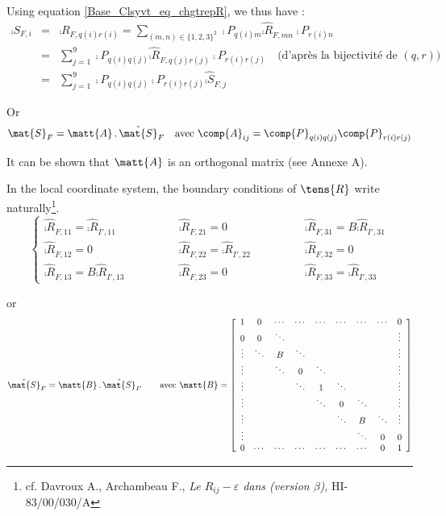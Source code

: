 Using equation \ref{Base_Clsyvt_eq_chgtrepR}, we thus have :
\begin{eqnarray}
\comp{S}_{F,i} & = & \comp{R}_{F,q(i)r(i)} =
\sum_{(m,n)\in\{1,2,3\}^2}\comp{P}_{q(i)m}\hat{\comp{R}}_{F,mn}\comp{P}_{r(i)n}\nonumber\\
&=&\sum_{j=1}^9\comp{P}_{q(i)q(j)}\hat{\comp{R}}_{F,q(j)r(j)}\comp{P}_{r(i)r(j)}
\quad\text{(d'apr\`es la bijectivit\'e de $(q,r)$)}\nonumber\\
&=&\sum_{j=1}^9\comp{P}_{q(i)q(j)}\comp{P}_{r(i)r(j)}\hat{\comp{S}}_{F,j}
\end{eqnarray}

Or
\begin{equation}
\mat{S}_{F}=\matt{A}\,.\,\hat{\mat{S}}_F\quad\text{avec }
\comp{A}_{ij}=\comp{P}_{q(i)q(j)}\comp{P}_{r(i)r(j)}
\end{equation}

It can be shown that $\matt{A}$ is an orthogonal matrix (see Annexe A).


In the local coordinate system, the boundary conditions of $\tens{R}$
write naturally\footnote{cf. Davroux A., Archambeau F., {\em Le
$R_{ij}-\varepsilon$ dans \CS (version $\beta$)}, HI-83/00/030/A}.
\begin{equation}
\label{Base_Clsyvt_eq_clRij}%
\left\{\begin{array}{lll}
\hat{\comp{R}}_{F,11}=\hat{\comp{R}}_{I',11} \qquad\qquad&
\hat{\comp{R}}_{F,21}=0 \qquad\qquad&
\hat{\comp{R}}_{F,31}=B\hat{\comp{R}}_{I',31} \\
\hat{\comp{R}}_{F,12}=0 \qquad\qquad&
\hat{\comp{R}}_{F,22}=\hat{\comp{R}}_{I',22} \qquad\qquad&
\hat{\comp{R}}_{F,32}=0 \\
\hat{\comp{R}}_{F,13}=B\hat{\comp{R}}_{I',13} \qquad\qquad&
\hat{\comp{R}}_{F,23}=0 \qquad\qquad&
\hat{\comp{R}}_{F,33}=\hat{\comp{R}}_{I',33}
\end{array}\right.
\end{equation}

or
\renewcommand{\arraystretch}{0.5}
\begin{equation}
\hat{\mat{S}}_F=\matt{B}\,.\,\hat{\mat{S}}_{I'}
\qquad\text{avec }\matt{B}=
\left[\begin{array}{ccccccccc}
1&0&\cdots&\cdots&\cdots&\cdots&\cdots&\cdots&0\\
0&0&\ddots&&&&&&\vdots\\
\vdots&\ddots&B&\ddots&&&&&\vdots\\
\vdots&&\ddots&0&\ddots&&&&\vdots\\
\vdots&&&\ddots&1&\ddots&&&\vdots\\
\vdots&&&&\ddots&0&\ddots&&\vdots\\
\vdots&&&&&\ddots&B&\ddots&\vdots\\
\vdots&&&&&&\ddots&0&0\\
0&\cdots&\cdots&\cdots&\cdots&\cdots&\cdots&0&1
\end{array}\right]
\end{equation}
\renewcommand{\arraystretch}{1.}


